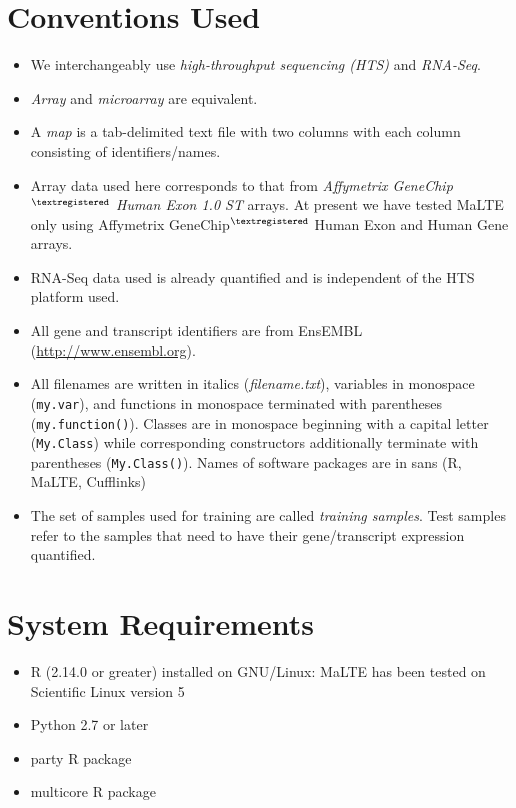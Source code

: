 \documentclass[a4paper,12pt]{article}
\begin{document}
\section{Conventions Used}
\label{conventions}
\begin{itemize}
\item We interchangeably use \textit{high-throughput sequencing (HTS)} and \textit{RNA-Seq}.
\item \textit{Array} and \textit{microarray} are equivalent.
\item A \textit{map} is a tab-delimited text file with two columns with each column consisting of identifiers/names.
\item Array data used here corresponds to that from \textit{Affymetrix GeneChip$^{\textregistered}$ Human Exon 1.0 ST} arrays. At present we have tested MaLTE only using Affymetrix GeneChip$^{\textregistered}$ Human Exon and Human Gene arrays.
\item RNA-Seq data used is already quantified and is independent of the HTS platform used.
\item All gene and transcript identifiers are from EnsEMBL (\url{http://www.ensembl.org}).
\item All filenames are written in italics (\textit{filename.txt}), variables in monospace (\texttt{my.var}), and functions in monospace terminated with parentheses (\texttt{my.function()}). Classes are in monospace beginning with a capital letter (\texttt{My.Class}) while corresponding constructors additionally terminate with parentheses (\texttt{My.Class()}). Names of software packages are in sans (\textsf{R}, \textsf{MaLTE}, \textsf{Cufflinks})
\item The set of samples used for training are called \textit{training samples}. Test samples refer to the samples that need to have their gene/transcript expression quantified.
\end{itemize}

\section{System Requirements}
\label{system}
\begin{itemize}
\item R (2.14.0 or greater) installed on GNU/Linux: MaLTE has been tested on Scientific Linux version 5
\item Python 2.7 or later
\item party \textsf{R} package
\item multicore \textsf{R} package
\end{itemize}
\end{document}
